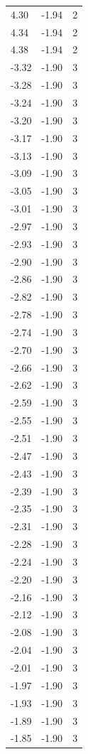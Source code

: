 \begin{longtable}{lrr}
  4.30 & -1.94 & 2 \\
  4.34 & -1.94 & 2 \\
  4.38 & -1.94 & 2 \\
  -3.32 & -1.90 & 3 \\
  -3.28 & -1.90 & 3 \\
  -3.24 & -1.90 & 3 \\
  -3.20 & -1.90 & 3 \\
  -3.17 & -1.90 & 3 \\
  -3.13 & -1.90 & 3 \\
  -3.09 & -1.90 & 3 \\
  -3.05 & -1.90 & 3 \\
  -3.01 & -1.90 & 3 \\
  -2.97 & -1.90 & 3 \\
  -2.93 & -1.90 & 3 \\
  -2.90 & -1.90 & 3 \\
  -2.86 & -1.90 & 3 \\
  -2.82 & -1.90 & 3 \\
  -2.78 & -1.90 & 3 \\
  -2.74 & -1.90 & 3 \\
  -2.70 & -1.90 & 3 \\
  -2.66 & -1.90 & 3 \\
  -2.62 & -1.90 & 3 \\
  -2.59 & -1.90 & 3 \\
  -2.55 & -1.90 & 3 \\
  -2.51 & -1.90 & 3 \\
  -2.47 & -1.90 & 3 \\
  -2.43 & -1.90 & 3 \\
  -2.39 & -1.90 & 3 \\
  -2.35 & -1.90 & 3 \\
  -2.31 & -1.90 & 3 \\
  -2.28 & -1.90 & 3 \\
  -2.24 & -1.90 & 3 \\
  -2.20 & -1.90 & 3 \\
  -2.16 & -1.90 & 3 \\
  -2.12 & -1.90 & 3 \\
  -2.08 & -1.90 & 3 \\
  -2.04 & -1.90 & 3 \\
  -2.01 & -1.90 & 3 \\
  -1.97 & -1.90 & 3 \\
  -1.93 & -1.90 & 3 \\
  -1.89 & -1.90 & 3 \\
  -1.85 & -1.90 & 3 \\

\end{longtable}
